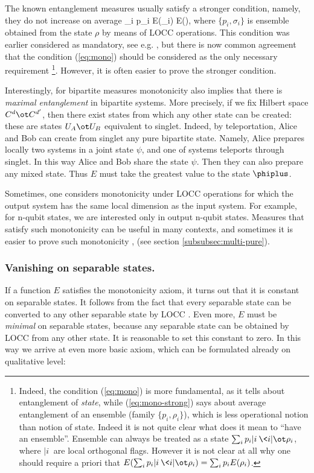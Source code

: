 \documentclass[rmp,12pt,preprint]{revtex4-2}
\begin{document}
The known entanglement measures usually satisfy a stronger condition,
namely, they do not increase on average
\be
\sum_i p_i E(\sigma_i) \leq E(\rho),
\label{eq:mono-strong}
\ee
where $\{p_i, \sigma_i\}$  is ensemble obtained from the state $\rho$
by means of LOCC operations. This condition was earlier considered as mandatory,
see e.g. \cite{Michal2001,Plenio2005-logneg}, but there is now common agreement
that the condition (\ref{eq:mono}) should be considered as the only necessary requirement
\footnote{Indeed, the condition (\ref{eq:mono}) is more fundamental, as
it tells about entanglement of {\it state}, while (\ref{eq:mono-strong})
says about average entanglement of an ensemble (family $\{p_i,\rho_i\}$), which is
less operational notion than notion of state.  Indeed it is not quite clear
what does it mean to ``have an ensemble''. Ensemble can always be treated
as a state $\sum_i p_i |i\>\<i|\ot \rho_i$, where $|i\>$ are local orthogonal flags.
However it is not  clear at all  why one should require a priori that
$E(\sum_i p_i |i\>\<i|\ot \rho_i)=\sum_ip_i E(\rho_i)$.}.
However, it is often easier to prove the stronger condition.

Interestingly, for bipartite measures monotonicity also implies
that there is {\it maximal entanglement} in bipartite systems.
More precisely, if we fix Hilbert space $C^d\ot C^{d'}$,
then there exist states from which any other state can be created:
these are states $U_A\ot U_B$ equivalent to singlet. Indeed, by teleportation, Alice
and Bob  can create from singlet any pure bipartite state. Namely, Alice prepares
locally two systems in a joint state $\psi$, and one of systems teleports through singlet.
In this way Alice and Bob share the state $\psi$. Then they can  also prepare
any mixed state. Thus $E$ must take  the greatest value to the state $\phiplus$.

Sometimes, one considers monotonicity under LOCC operations
for which the output system has the same local dimension as the input system.
For example, for n-qubit states, we are interested only in output
n-qubit states. Measures that satisfy such monotonicity
can be useful in many contexts, and sometimes it is easier to
prove such monotonicity \cite{VerstraeteDM2001-normal},
(see section \ref{subsubsec:multi-pure}).




\subsubsection{Vanishing on separable states.}
If a function  $E$ satisfies the monotonicity axiom, it turns out that
it is constant on separable states. It follows from  the fact that
every separable state can be converted to any other separable  state by LOCC
\cite{Vidal-mon2000}.
Even more, $E$ must be {\it minimal} on separable states, because any separable
state can be obtained by LOCC from any other state. It is reasonable to set
this constant to zero. In this way we arrive at even more  basic axiom,
which can be formulated already on qualitative level:
\end{document}
